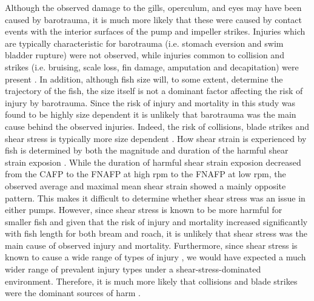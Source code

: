 \documentclass[fleqn,10pt]{wlscirep}
\begin{document}
Although the observed damage to the gills, operculum, and eyes may have been caused by barotrauma, it is much more likely that these were caused by contact events with the interior surfaces of the pump and impeller strikes. Injuries which are typically characteristic for barotrauma (i.e. stomach eversion and swim bladder rupture) were not observed, while injuries common to collision and strikes (i.e. bruising, scale loss, fin damage, amputation and decapitation) were present \cite{Koukouvinis2023StateIndicators}. In addition, although fish size will, to some extent, determine the trajectory of the fish, the size itself is not a dominant factor affecting the risk of injury by barotrauma. Since the risk of injury and mortality in this study was found to be highly size dependent it is unlikely that barotrauma was the main cause behind the observed injuries. Indeed, the risk of collisions, blade strikes and shear stress is typically more size dependent \cite{Cox2023FishReview}. How shear strain is experienced by fish is determined by both the magnitude and duration of the harmful shear strain exposion \cite{Cada1997DevelopmentTurbines}. While the duration of harmful shear strain exposion decreased from the CAFP to the FNAFP at high rpm to the FNAFP at low rpm, the observed average and maximal mean shear strain showed a mainly opposite pattern. This makes it difficult to determine whether shear stress was an issue in either pumps. However, since shear stress is known to be more harmful for smaller fish \cite{Neitzel2000LaboratoryFish} and given that the risk of injury and mortality increased significantly with fish length for both bream and roach, it is unlikely that shear stress was the main cause of observed injury and mortality. Furthermore, since shear stress is known to cause a wide range of types of injury \cite{Cox2023FishReview}, we would have expected a much wider range of prevalent injury types under a shear-stress-dominated environment. Therefore, it is much more likely that collisions and blade strikes were the dominant sources of harm \cite{Brown2014UnderstandingResources,Cox2023FishReview}. 
\end{document}
